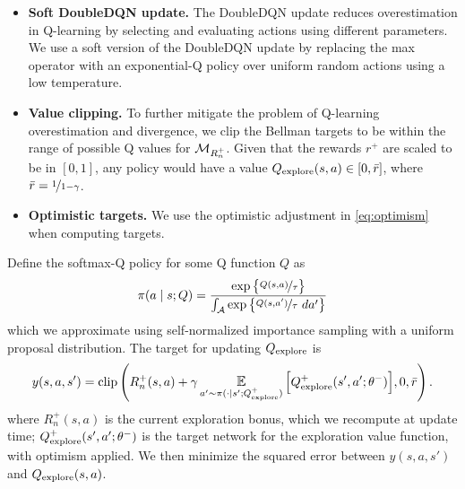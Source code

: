 \begin{itemize}
    \item \textbf{Soft DoubleDQN update.} The DoubleDQN \citep{Hasselt2016DeepRL} update reduces overestimation in Q-learning by selecting and evaluating actions using different parameters.
    We use a soft version of the DoubleDQN update by replacing the max operator with an exponential-Q policy over uniform random actions using a low temperature.
    \item \textbf{Value clipping.} To further mitigate the problem of Q-learning overestimation and divergence, we clip the Bellman targets to be within the range of possible Q values for $\mathcal{M}_{R^+_n}$.
    Given that the rewards $r^+$ are scaled to be in $[0, 1]$, any policy would have a value $Q_{\text{explore}}(s, a) \in [0, \bar{r}]$, where $\bar{r} = \nicefrac{1}{1 - \gamma}$.
    \item \textbf{Optimistic targets.} We use the optimistic adjustment in \cref{eq:optimism} when computing targets.
\end{itemize}

Define the softmax-Q policy for some Q function $Q$ as
\begin{align}
    \pi(a \mid s; Q) = \frac{\exp \big\{ \nicefrac{Q(s, a)}{\tau} \big\}}{\int_\mathcal{A} \exp \big\{ \nicefrac{Q(s, a')}{\tau}  ~da' \big\}}
\end{align}
which we approximate using self-normalized importance sampling with a uniform proposal distribution.
The target for updating $Q_{\text{explore}}$ is
\begin{align} \label{eq:update_target}
    y(s, a, s') = \text{clip} \left( R^+_n(s, a) + \gamma \E_{a' \sim \pi(\cdot \mid s'; \qex^+)} \Big[ \qex^+(s', a'; \theta^-) \Big], 0, \bar{r} \right).
\end{align}
where $R^+_n(s, a)$ is the current exploration bonus, which we recompute at update time; $Q_{\text{explore}}^+(s', a'; \theta^-)$ is the target network for the exploration value function, with optimism applied.
We then minimize the squared error between $y(s, a, s')$ and $Q_{\text{explore}}(s, a)$.


 \label{sec:environments_appendix}

